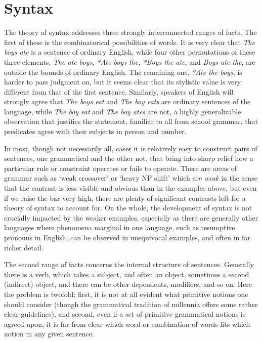 \chapter{Syntax}

The theory of syntax addresses three strongly interconnected ranges of facts.
The first of these is the combinatorical possibilities of words. It is very
clear that {\it The boys ate} is a sentence of ordinary English, while four
other permutations of these three elements, {\it *The ate boys, *Ate boys the,
  *Boys the ate}, and {\it *Boys ate the}, are outside the bounds of ordinary
English. The remaining one, {\it ?Ate the boys}, is harder to pass judgment
on, but it seems clear that its stylistic value is very different from that of
the first sentence. Similarly, speakers of English will strongly agree that
{\it The boys eat} and {\it The boy eats} are ordinary sentences of the
language, while {\it *The boy eat} and {\it *The boy ates} are not, a highly
generalizable observation that justifies the statement, familiar to all from
school grammar, that predicates agree with their subjects in person and
number.  

In most, though not necessarily all, cases it is relatively easy to construct
pairs of sentences, one grammatical and the other not, that bring into sharp
relief how a particular rule or constraint operates or fails to operate. There
are areas of grammar such as `weak crossover' or `heavy NP shift' which are
{\it weak} in the sense that the contrast is less visible and obvious than in
the examples above, but even if we raise the bar very high, there are plenty
of significant contrasts left for a theory of syntax to account for. On the
whole, the development of syntax is not crucially impacted by the weaker
examples, especially as there are generally other languages where phenomena
marginal in one language, such as resumptive pronouns in English, can be
observed in unequivocal examples, and often in far richer detail. 

The second range of facts concerns the internal structure of sentences.
Generally there is a verb, which takes a subject, and often an object,
sometimes a second (indirect) object, and there can be other dependents,
modifiers, and so on.  Here the problem is twofold: first, it is not at all
evident what primitive notions one should consider (though the grammatical
tradition of millennia offers some rather clear guidelines), and second, even
if a set of primitive grammatical notions is agreed upon, it is far from clear
which word or combination of words fits which notion in any given sentence. 

